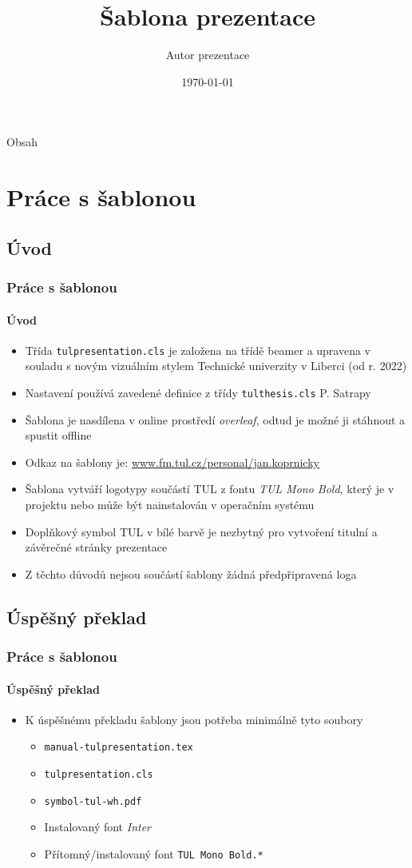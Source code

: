 \documentclass[TUL,aspect169]{tulpresentation} %
\title{Šablona prezentace}%
\author{Autor prezentace}
\institute{XXX TUL}
\date{\today} %
\begin{document}
 
  \TULtitleframe

\begin{frame}{Obsah} 
   {\tableofcontents[sections={1-}]}%
\end{frame} 

\section{Práce s šablonou}
\subsection{Úvod}
\begin{frame}[fragile]
  \frametitle{Práce s šablonou}
  \framesubtitle{Úvod}
  \begin{itemize}
    \item Třída \verb|tulpresentation.cls| je založena na třídě beamer a upravena v souladu s novým vizuálním stylem Technické univerzity v Liberci (od r. 2022)
    \item Nastavení používá zavedené definice z třídy \verb|tulthesis.cls| P. Satrapy
    \item Šablona je nasdílena v online prostředí \emph{overleaf}, odtud je možné ji stáhnout a spustit offline 
    \item Odkaz na šablony je: \href{www.fm.tul.cz/personal/jan.koprnicky}{www.fm.tul.cz/personal/jan.koprnicky}
    \item Šablona vytváří logotypy součástí TUL z fontu \emph{TUL Mono Bold}, který je v projektu nebo může být nainstalován v operačním systému
    \item Doplňkový symbol TUL v bílé barvě je nezbytný pro vytvoření titulní a závěrečné stránky prezentace 
    \item Z těchto důvodů nejsou součástí šablony žádná předpřipravená loga
  \end{itemize}
\end{frame}

\subsection{Úspěšný překlad}
\begin{frame}[fragile]
  \frametitle{Práce s šablonou}
  \framesubtitle{Úspěšný překlad} 
  \begin{itemize}
  \item K úspěšnému překladu šablony jsou potřeba minimálně tyto soubory
    \begin{itemize}
      \item \verb|manual-tulpresentation.tex|
      \item \verb|tulpresentation.cls|
      \item \verb|symbol-tul-wh.pdf|
      \item Instalovaný font \emph{Inter}     
      \item Přítomný/instalovaný font \verb|TUL Mono Bold.*| 
    \end{itemize}   
  \end{itemize}
\end{frame}
\end{document}
